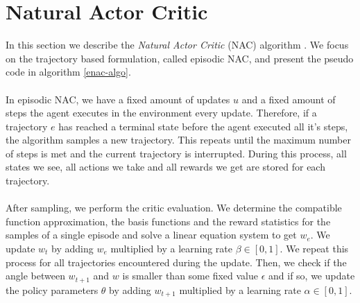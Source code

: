 \section{Natural Actor Critic}
\label{sec:nac}
In this section we describe the \textit{Natural Actor Critic} (NAC) algorithm \citep{peters2005natural}. We focus on the trajectory based formulation, called episodic NAC, and present the pseudo code in algorithm \ref{enac-algo}.
\\\\
In episodic NAC, we have a fixed amount of updates $u$ and a fixed amount of steps the agent executes in the environment every update. Therefore, if a trajectory $e$ has reached a terminal state before the agent executed all it's steps, the algorithm samples a new trajectory. This repeats until the maximum number of steps is met and the current trajectory is interrupted. During this process, all states we see, all actions we take and all rewards we get are stored for each trajectory.
\\\\
After sampling, we perform the critic evaluation. We determine the compatible function approximation, the basis functions and the reward statistics for the samples of a single episode and solve a linear equation system to get $w_e$. We update $w_t$ by adding $w_e$ multiplied by a learning rate $\beta \in [0,1]$. We repeat this process for all trajectories encountered during the update. Then, we check if the angle between $w_{t+1}$ and $w$ is smaller than some fixed value $\epsilon$ and if so, we update the policy parameters $\theta$ by adding $w_{t+1}$ multiplied by a learning rate $\alpha \in [0,1]$.

